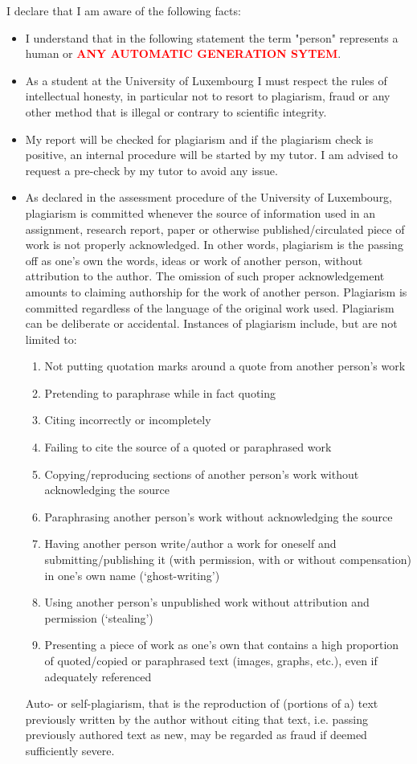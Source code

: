 \documentclass[conference,compsoc]{IEEEtran}
\begin{document}
I declare that I am aware of the following facts:
\begin{itemize}
	\item I understand that in the following statement the term "person" represents a human or \textbf{\textcolor{red}{ANY AUTOMATIC GENERATION SYTEM}}.
	\item As a student at the University of Luxembourg I must respect the rules of intellectual honesty, in particular not to resort to plagiarism, fraud or any other method that is illegal or contrary to scientific integrity.
	\item My report will be checked for plagiarism and if the plagiarism check is positive, an internal procedure will be started by my tutor. I am advised to request a pre-check by my tutor to avoid any issue.
	\item As declared in the assessment procedure of the University of Luxembourg, plagiarism is committed whenever the source of information used in an assignment, research report, paper or otherwise published/circulated piece of work is not properly acknowledged. In other words, plagiarism is the passing off as one’s own the words, ideas or work of another person, without attribution to the author. The omission of such proper acknowledgement amounts to claiming authorship for the work of another person. Plagiarism is committed regardless of the language of the original work used. Plagiarism can be deliberate or accidental.
	      Instances of plagiarism include, but are not limited to:
	      \begin{enumerate}
		      \item Not putting quotation marks around a quote from another person’s work
		      \item Pretending to paraphrase while in fact quoting
		      \item Citing incorrectly or incompletely
		      \item Failing to cite the source of a quoted or paraphrased work
		      \item Copying/reproducing sections of another person’s work without acknowledging the source
		      \item Paraphrasing another person’s work without acknowledging the source
		      \item Having another person write/author a work for oneself and submitting/publishing it (with permission, with or without compensation) in one’s own name (‘ghost-writing’)
		      \item Using another person’s unpublished work without attribution and permission (‘stealing’)
		      \item Presenting a piece of work as one’s own that contains a high proportion of quoted/copied or paraphrased text (images, graphs, etc.), even if adequately referenced
	      \end{enumerate}
	      Auto- or self-plagiarism, that is the reproduction of (portions of a) text previously written by the author without citing that text, i.e. passing previously authored text as new, may be regarded as fraud if deemed sufficiently severe.
\end{itemize}

\cleardoublepage
\end{document}

